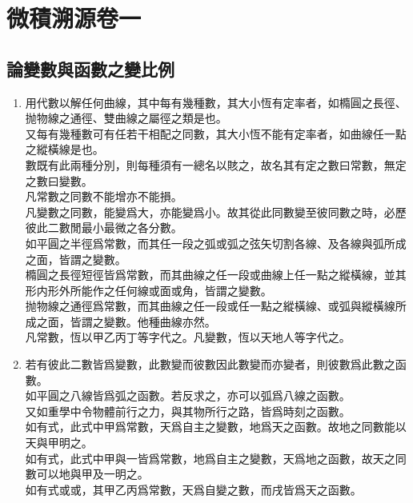 \chapter {微積溯源卷一}
\setcounter{page}{1}
\section {論變數與函數之變比例}
\thispagestyle{fancy}
\begin{enumerate} [label={第\chinese*款},nolistsep]
	\item 用代數以解任何曲線，其中每有幾種數，其大小恆有定率者，如橢圓之長徑、抛物線之通徑、雙曲線之屬徑之類是也。\\
	又每有幾種數可有任若干相配之同數，其大小恆不能有定率者，如曲線任一點之縱橫線是也。\\
	數既有此兩種分別，則每種須有一總名以賅之，故名其有定之數曰常數，無定之數曰變數。\\
	凡常數之同數不能增亦不能損。\\
	凡變數之同數，能變爲大，亦能變爲小。故其從此同數變至彼同數之時，必歷彼此二數閒最小最微之各分數。\\
	如平圓之半徑爲常數，而其任一段之弧或弧之弦矢切割各線、及各線與弧所成之面，皆謂之變數。\\
	橢圓之長徑短徑皆爲常數，而其曲線之任一段或曲線上任一點之縱橫線，並其形内形外所能作之任何線或面或角，皆謂之變數。\\
	抛物線之通徑爲常數，而其曲線之任一段或任一點之縱橫線、或弧與縱橫線所成之面，皆謂之變數。他種曲線亦然。\\
	凡常數，恆以甲乙丙丁等字代之。凡變數，恆以天地人等字代之。
	\item 若有彼此二數皆爲變數，此數變而彼數因此數變而亦變者，則彼數爲此數之函數。\\
	如平圓之八線皆爲弧之函數。若反求之，亦可以弧爲八線之函數。\\
	又如重學中令物體前行之力，與其物所行之路，皆爲時刻之函數。\\
	如有式\CJKmove，此式中甲爲常數，天爲自主之變數，地爲天之函數。故地之同數能以天與甲明之。\\
	如有式\CJKmove，此式中甲與一皆爲常數，地爲自主之變數，天爲地之函數，故天之同數可以地與甲及一明之。\\
	如有式\CJKmove 或\CJKmove 或\CJKmove，其甲乙丙爲常數，天爲自變之數，而戌皆爲天之函數。\\

\end{enumerate}

